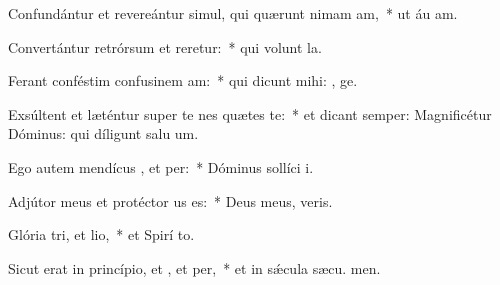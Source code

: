 \item Confundántur et revereántur simul, qui quærunt nimam am,~* ut áu am.
\item Convertántur retrórsum et reretur:~* qui volunt  la.
\item Ferant conféstim confusinem am:~* qui dicunt mihi: , ge.
\item Exsúltent et læténtur super te nes quætes te:~* et dicant semper: Magnificétur Dóminus: qui díligunt salu um.
\item Ego autem mendícus , et per:~* Dóminus sollíci  i.
\item Adjútor meus et protéctor us  es:~* Deus meus,  veris.
\item Glória tri, et lio,~* et Spirí to.
\item Sicut erat in princípio, et , et per,~* et in sǽcula sæcu. men.
